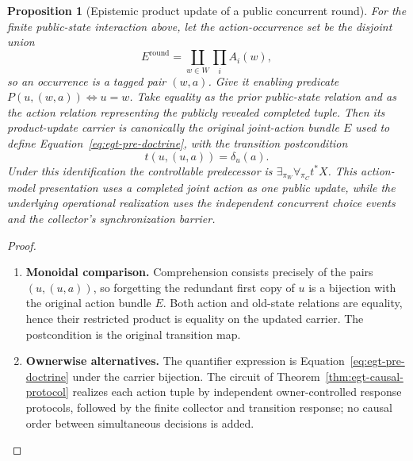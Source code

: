 \documentclass[11pt,a4paper]{article}
\numberwithin{equation}{section}
\newtheorem{proposition}[theorem]{Proposition}
\theoremstyle{definition}
\theoremstyle{remark}
\theoremstyle{plain}
\begin{document}
\begin{proposition}[Epistemic product update of a public concurrent round]
\label{prop:egt-public-round-action-update}
For the finite public-state interaction above, let the action-occurrence
set be the disjoint union
\[
 E^{\mathrm{round}}=\coprod_{w\in W}\prod_i A_i(w),
\]
so an occurrence is a tagged pair $(w,a)$. Give it enabling predicate
$P(u,(w,a))\iff u=w$. Take equality as the prior public-state
relation and as the action relation representing the publicly revealed
completed tuple. Then its product-update carrier is canonically
the original joint-action bundle $E$ used to define
Equation~\eqref{eq:egt-pre-doctrine}, with the transition
postcondition
\[
 t(u,(u,a))=\delta_u(a).
\]
Under this identification the controllable predecessor is
$\exists_{\pi_W}\forall_{\pi_C}t^*X$. This action-model presentation
uses a completed joint action as one public update, while the
underlying operational realization uses the independent concurrent
choice events and the collector's synchronization barrier.
\end{proposition}
\begin{proof}
\leavevmode
\begin{enumerate}[label=\textup{(\arabic*)},leftmargin=*,itemsep=4pt,topsep=3pt]
  \item \textbf{Monoidal comparison.} Comprehension consists precisely of the pairs $(u,(u,a))$, so
forgetting the redundant first copy of $u$ is a bijection with the
original action bundle $E$. Both action and old-state relations are
equality, hence their restricted product is equality on the updated
carrier. The postcondition is the original transition map.
  \item \textbf{Ownerwise alternatives.} The
quantifier expression is Equation~\eqref{eq:egt-pre-doctrine} under
the carrier bijection. The circuit of
Theorem~\ref{thm:egt-causal-protocol} realizes each action tuple by
independent owner-controlled response protocols, followed by the
finite collector and transition response; no causal order between
simultaneous decisions is added.
\end{enumerate}
\end{proof}
\end{document}
